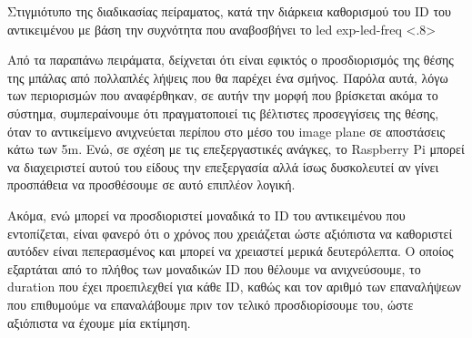 {Στιγμιότυπο της διαδικασίας πείραματος, κατά την διάρκεια καθορισμού του ID του αντικειμένου με βάση την συχνότητα που αναβοσβήνει το led}%
{exp-led-freq}%
<.8>

Από τα παραπάνω πειράματα, δείχνεται ότι είναι εφικτός ο προσδιορισμός της θέσης της μπάλας από πολλαπλές λήψεις που θα παρέχει ένα σμήνος. Παρόλα αυτά, λόγω των περιορισμών που αναφέρθηκαν, σε αυτήν την μορφή που βρίσκεται ακόμα το σύστημα, συμπεραίνουμε ότι πρα\-γμα\-το\-ποι\-εί τις βέλτιστες προσεγγίσεις της θέσης, όταν το αντικείμενο ανιχνεύεται περίπου στο μέσο του image plane σε αποστάσεις κάτω των 5m. Ενώ, σε σχέση με τις ε\-πε\-ξε\-ργα\-στι\-κές ανάγκες, το Raspberry Pi μπορεί να διαχειριστεί αυτού του είδους την επεξεργασία αλλά ίσως δυσκολευτεί αν γίνει προσπάθεια να προσθέσουμε σε αυτό επιπλέον λογική. 

Ακόμα, ενώ μπορεί να προσδιοριστεί μοναδικά το ID του αντικειμένου που εντοπίζεται, είναι φανερό ότι ο χρόνος που χρειάζεται ώστε αξιόπιστα να καθοριστεί αυτό\udot δεν είναι πεπερασμένος και μπορεί να χρειαστεί μερικά δευτερόλεπτα. Ο οποίος εξαρτάται από το πλήθος των μοναδικών ID που θέλουμε να ανιχνεύσουμε, το duration που έχει προεπιλεχθεί για κάθε ID, καθώς και τον αριθμό των επαναλήψεων που επιθυμούμε να επαναλάβουμε πριν τον τελικό προσδιορίσουμε του, ώστε αξιόπιστα να έχουμε μία εκτίμηση.






